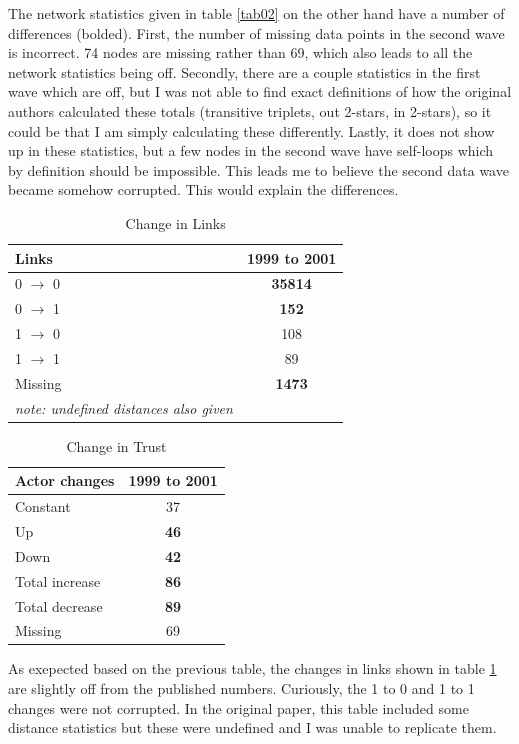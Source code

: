 \documentclass[12pt]{article} %
\numberwithin{equation}{section}		%
\numberwithin{figure}{section}			%
\numberwithin{table}{section}				%
\begin{document}
 The network statistics given in table \ref{tab02} on the other hand have a number of differences (bolded). First, the number of missing data points in the second wave is incorrect. 74 nodes are missing rather than 69, which also leads to all the network statistics being off. Secondly, there are a couple statistics in the first wave which are off, but I was not able to find exact definitions of how the original authors calculated these totals (transitive triplets, out 2-stars, in 2-stars), so it could be that I am simply calculating these differently. Lastly, it does not show up in these statistics, but a few nodes in the second wave have self-loops which by definition should be impossible. This leads me to believe the second data wave became somehow corrupted. This would explain the differences.

\begin{table}[ht]
 	   \caption{\label{tab03} Change in Links}
 	\centering
 	\begin{tabular}{lc}
 		\hline
 		Links & 1999 to 2001 \\ 	
 		\hline
 		0 $\rightarrow$ 0 & \textbf{35814} \\
 		0 $\rightarrow$ 1 & \textbf{152} \\
 		1 $\rightarrow$ 0 & 108 \\
 		1 $\rightarrow$ 1 & 89 \\
 		Missing & \textbf{1473} \\
 		\textit{note: undefined distances also given} & \\
 		\hline
 	\end{tabular}
 \end{table}

 \begin{table}[ht]
 	   \caption{\label{tab04} Change in Trust}
 	\centering
 	\begin{tabular}{lc}
 		\hline
 		Actor changes & 1999 to 2001 \\ 	
 		\hline
 		Constant & 37 \\
 		Up & \textbf{46} \\
 		Down & \textbf{42} \\
 		Total increase & \textbf{86} \\
 		Total decrease & \textbf{89} \\
 		Missing & 69 \\
 		\hline
 	\end{tabular}
 \end{table}

As exepected based on the previous table, the changes in links shown in table \ref{tab03} are slightly off from the published numbers. Curiously, the 1 to 0 and 1 to 1 changes were not corrupted. In the original paper, this table included some distance statistics but these were undefined and I was unable to replicate them.
\end{document}
